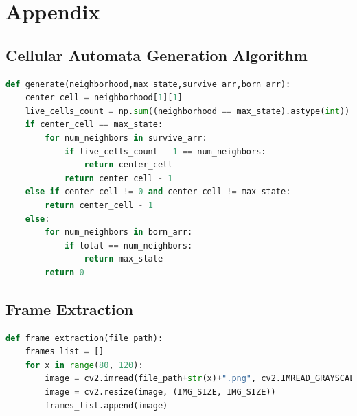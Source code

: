 \documentclass[12pt]{article}
\numberwithin{figure}{section} %
\begin{document}
\newpage
\section{Appendix}
\subsection{Cellular Automata Generation Algorithm}
\label{subsection:Cellular Automata Generation Algorithm}
\begin{lstlisting}[language=Python]
def generate(neighborhood,max_state,survive_arr,born_arr):
    center_cell = neighborhood[1][1]
    live_cells_count = np.sum((neighborhood == max_state).astype(int))
    if center_cell == max_state: 
        for num_neighbors in survive_arr:
            if live_cells_count - 1 == num_neighbors: 
                return center_cell 
            return center_cell - 1
    else if center_cell != 0 and center_cell != max_state:
        return center_cell - 1
    else:
        for num_neighbors in born_arr: 
            if total == num_neighbors:
                return max_state 
        return 0
\end{lstlisting}

\subsection{Frame Extraction}
\label{subsection:Frame Extraction}
\begin{lstlisting}[language = Python]
def frame_extraction(file_path):
    frames_list = []
    for x in range(80, 120):
        image = cv2.imread(file_path+str(x)+".png", cv2.IMREAD_GRAYSCALE)
        image = cv2.resize(image, (IMG_SIZE, IMG_SIZE))
        frames_list.append(image)
\end{lstlisting}
\end{document}
